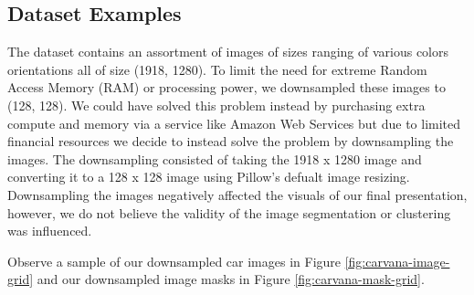\documentclass[paper=letter, fontsize=12pt]{article}
\numberwithin{equation}{section} %
\numberwithin{figure}{section} %
\numberwithin{table}{section} %
\begin{document}
\subsection{Dataset Examples}

The dataset contains an assortment of images of sizes ranging of various colors
orientations all of size (1918, 1280). To limit the need for extreme Random Access Memory (RAM)
or processing power, we downsampled these images to (128, 128). We could have solved
this problem instead by purchasing extra compute and memory via a service like
Amazon Web Services but due to limited financial resources we decide to instead
solve the problem by downsampling the images. The downsampling consisted of taking
the 1918 x 1280 image and converting it to a 128 x 128 image using Pillow’s defualt image
resizing. Downsampling the images negatively affected the visuals of our final presentation,
however, we do not believe the validity of the image segmentation or clustering was influenced.

Observe a sample of our downsampled car images in Figure \ref{fig:carvana-image-grid} and our
downsampled image masks in Figure \ref{fig:carvana-mask-grid}.
\end{document}
